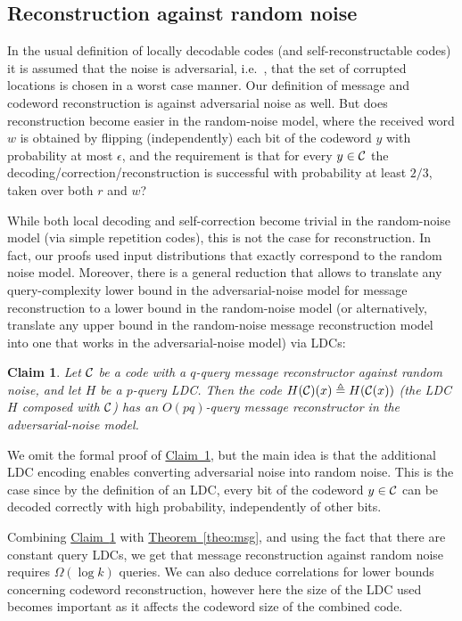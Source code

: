 \documentclass[10pt]{article}
\newtheorem{claim}[theorem]{Claim}
\theoremstyle{definition}
\providecommand{\ie}{i.e.\ }
\numberwithin{equation}{section}
\newcommand{\expref}[2]{\texorpdfstring{\hyperref[#2]{#1~\ref{#2}}}{#1~\ref{#2}}}
\newcommand{\CC}{{\cal C}}
\begin{document}
\subsection{Reconstruction against random noise}\label{sec:conclusion:rnd}
In the usual definition of locally decodable codes (and self-reconstructable codes) it is assumed that the noise is adversarial, \ie, that the
 set of corrupted locations is chosen in a worst case manner. Our definition of message and codeword
reconstruction is against adversarial noise as well. But does reconstruction become easier in the random-noise model, where the received word $w$ is obtained by flipping (independently) each bit of the codeword $y$ with probability at most $\epsilon$, and the requirement is that for every $y \in \CC$ the decoding/correction/reconstruction is successful with probability at least $2/3$, taken over both $r$ and $w$?

While both local decoding and 
%
self-correction become trivial in the random-noise model (via simple repetition codes), this is not the case for reconstruction. In fact, our proofs used input distributions that exactly correspond to the random noise model. Moreover, there is a general reduction that allows to translate any query-complexity lower bound in the adversarial-noise model for message reconstruction to a lower bound in the random-noise model (or alternatively, translate any upper bound in the random-noise message reconstruction model into one that works in the adversarial-noise model) via LDCs:

\begin{claim}\label{lem:randomnoise} Let $\CC$ be a code with a $q$-query message reconstructor against random noise, and let $H$ be a $p$-query LDC\@. Then the code $H(\CC)(x) \triangleq H(\CC(x))$ (the LDC $H$ composed with $\CC$) has an $O(pq)$-query message reconstructor in the adversarial-noise model.
\end{claim}

We omit the formal proof of \expref{Claim}{lem:randomnoise}, but the main idea is that the additional LDC encoding enables converting adversarial noise into random noise. This is the case since by the definition of an LDC, every bit of the codeword $y \in \CC$ can be decoded correctly with high probability, independently of other bits.

Combining \expref{Claim}{lem:randomnoise} with \expref{Theorem}{theo:msg}, and using the fact that there are constant query LDCs, we
get that message reconstruction against random noise requires $\Omega(\log k)$ queries. We can also deduce correlations for lower bounds concerning codeword reconstruction, however here the size of the LDC used becomes important as it affects the codeword size of the combined code.
%
\end{document}
